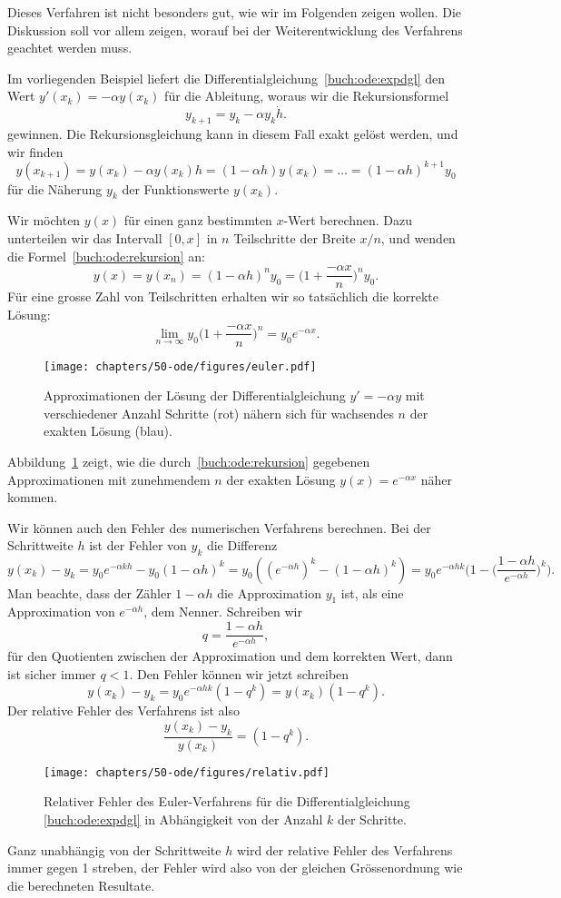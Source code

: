 Dieses Verfahren ist nicht besonders gut, wie wir im Folgenden zeigen
wollen.
Die Diskussion soll vor allem zeigen, worauf bei der Weiterentwicklung
des Verfahrens geachtet werden muss.

Im vorliegenden Beispiel liefert die
Differentialgleichung~\eqref{buch:ode:expdgl}
den Wert $y'(x_k)=-\alpha y(x_k)$ für die Ableitung,
woraus wir die Rekursionsformel
\[
y_{k+1}=y_k - \alpha y_k \dot h.
\]
gewinnen.
Die Rekursionsgleichung kann in diesem Fall exakt gelöst werden,
und wir finden
%
\begin{equation}
y(x_{k+1}) = y(x_k)-\alpha y(x_k) h=(1-\alpha h) y(x_k)=\dots
=(1-\alpha h)^{k+1}y_0
\label{buch:ode:rekursion}
\end{equation}
für die Näherung $y_k$ der Funktionswerte $y(x_k)$.

Wir möchten $y(x)$ für einen ganz bestimmten $x$-Wert berechnen.
Dazu unterteilen wir das Intervall $[0,x]$ in $n$ Teilschritte der
Breite $x/n$, und wenden die Formel~\eqref{buch:ode:rekursion} an:
\[
y(x)=y(x_n)=(1-\alpha h)^n y_0=\biggl(1+\frac{-\alpha x}{n}\biggr)^n y_0.
\]
Für eine grosse Zahl von Teilschritten erhalten wir so tatsächlich die
korrekte Lösung:
\[
\lim_{n\to\infty}y_0\biggl(1+\frac{-\alpha x}n\biggr)^n=y_0 e^{-\alpha x}.
\]
\begin{figure}
\centering
\texttt{[image: chapters/50-ode/figures/euler.pdf]}
\caption{Approximationen der Lösung der Differentialgleichung $y'=-\alpha y$
mit verschiedener Anzahl Schritte (rot) nähern sich für wachsendes
$n$ der exakten Lösung (blau).
\label{buch:ode:approximation}}
\end{figure}%
Abbildung~\ref{buch:ode:approximation} zeigt, wie die
durch~\eqref{buch:ode:rekursion} gegebenen Approximationen mit zunehmendem
$n$ der exakten Lösung $y(x)=e^{-\alpha x}$ näher kommen.

Wir können auch den Fehler des numerischen Verfahrens berechnen.
Bei der Schrittweite $h$ ist der Fehler von $y_k$ die Differenz
\[
y(x_k)-y_k
=
y_0e^{-\alpha kh}-y_0(1-\alpha h)^k
=
y_0((e^{-\alpha h})^k - (1-\alpha h)^k)
=
y_0e^{-\alpha hk}\biggl(
1-\biggl(\frac{1-\alpha h}{e^{-\alpha h}}\biggr)^k
\biggr).
\]
Man beachte, dass der Zähler $1-\alpha h$ die Approximation
$y_1$ ist, als eine Approximation von $e^{-\alpha h}$, dem Nenner.
Schreiben wir
\[
q=\frac{1-\alpha h}{e^{-\alpha h}},
\]
für den Quotienten zwischen der Approximation und dem korrekten Wert,
dann ist sicher immer $q<1$.
Den Fehler können wir jetzt schreiben
\[
y(x_k)-y_k = y_0e^{-\alpha hk}(1-q^k) = y(x_k)(1-q^k).
\]
Der relative Fehler des Verfahrens ist also
\[
\frac{y(x_k)-y_k}{y(x_k)}=(1-q^k).
\]
\begin{figure}
\centering
\texttt{[image: chapters/50-ode/figures/relativ.pdf]}
\caption{Relativer Fehler des Euler-Verfahrens für die Differentialgleichung
\eqref{buch:ode:expdgl} in Abhängigkeit von der Anzahl $k$ der Schritte.
%
\label{buch:ode:relfehler}}
\end{figure}%
Ganz unabhängig von der Schrittweite $h$ wird der relative Fehler
des Verfahrens immer gegen 1 streben, der Fehler wird also von der
gleichen Grössenordnung wie die berechneten Resultate.
%

